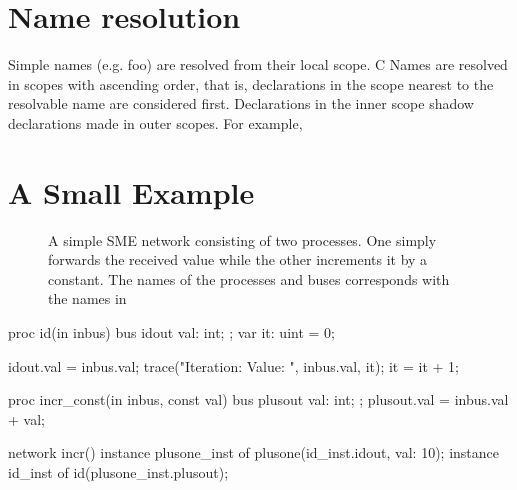 
\section{Name resolution}
Simple names (e.g. {\ttfamily foo}) are resolved from their local scope. C
Names are resolved in scopes with ascending order, that is, declarations in the
scope nearest to the resolvable name are considered first. Declarations in the
inner scope shadow declarations made in outer scopes. For example, 

\section{A Small Example}
\label{sec:smeilex}
\begin{figure}
  \centering
    \caption{A simple SME network consisting of two processes. One simply
      forwards the received value while the other increments it by a
      constant. The names of the processes and buses corresponds with the names
      in }
  \label{fig:addone}
\end{figure}
\begin{widefigure}
\begin{smeilcode2}
proc id(in inbus)
  bus idout {
    val: int;
  };
  var it: uint = 0;
{
  idout.val = inbus.val;
  trace("Iteration: {} Value: {}",
    inbus.val, it);
  it = it + 1;

}



proc incr_const(in inbus, const val)
  bus plusout {
     val: int;
  };
{
  plusout.val = inbus.val + val;
}

network incr() {
  instance plusone_inst of
    plusone(id_inst.idout, val: 10);
  instance id_inst of
    id(plusone_inst.plusout);
}
\end{smeilcode2}
\caption{An example program written in SMEIL.}
\label{fig:addone.sme}
\end{widefigure}

